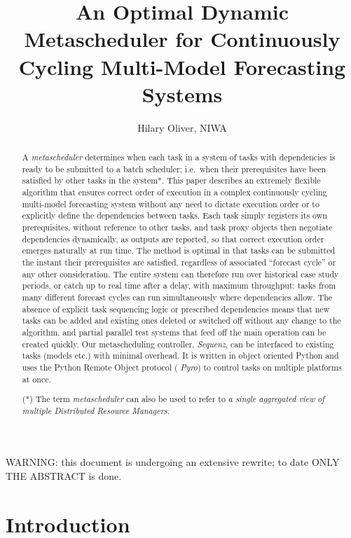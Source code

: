 \documentclass[11pt,a4paper]{article}
\title{An Optimal Dynamic Metascheduler for Continuously Cycling
Multi-Model Forecasting Systems}
\author{Hilary Oliver, NIWA}
\begin{document}
\maketitle
\tableofcontents

{\huge WARNING: this document is undergoing an extensive rewrite; to
date ONLY THE ABSTRACT is done.}

\begin{abstract}

A {\it metascheduler} determines when each task in a system of tasks
with dependencies is ready to be submitted to a batch scheduler; i.e.\
when their prerequisites have been satisfied by other tasks in the
system*. This paper describes an extremely flexible algorithm that
ensures correct order of execution in a complex continuously cycling
multi-model forecasting system without any need to dictate execution
order or to explicitly define the dependencies between tasks.  Each task
simply registers its own prerequisites, without reference to other
tasks, and task proxy objects then negotiate dependencies dynamically,
as outputs are reported, so that correct execution order emerges
naturally at run time. The method is optimal in that tasks can be
submitted the instant their prerequisites are satisfied, regardless of
associated ``forecast cycle'' or any other consideration. The entire
system can therefore run over historical case study periods, or catch up
to real time after a delay, with maximum throughput: tasks from many
different forecast cycles can run simultaneously where dependencies
allow. The absence of explicit task sequencing logic or prescribed
dependencies means that new tasks can be added and existing ones deleted
or switched off without any change to the algorithm, and partial
parallel test systems that feed off the main operation can be created
quickly. Our metascheduling controller, {\em Sequenz}, can be interfaced
to existing tasks (models etc.) with minimal overhead. It is written in
object oriented Python and uses the Python Remote Object protocol ({\em
Pyro}) to control tasks on multiple platforms at once. 

(*) The term {\em metascheduler} can also be used to refer to {\it a
single aggregated view of multiple Distributed Resource Managers}.

\end{abstract}

\section{Introduction}
\end{document}
